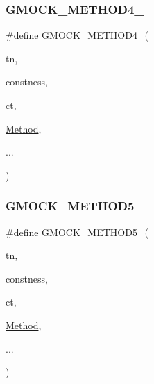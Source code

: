 \mbox{\label{_obj__test_2lib_2googletest-release-1_88_81_2googlemock_2include_2gmock_2gmock-generated-function-mockers_8h_ab6430f2cfad9de4aca5258ea559294bb}} 
\subsubsection{\texorpdfstring{GMOCK\_METHOD4\_}{GMOCK\_METHOD4\_}}
{\footnotesize\ttfamily \#define G\+M\+O\+C\+K\+\_\+\+M\+E\+T\+H\+O\+D4\+\_\+(\begin{DoxyParamCaption}\item[{}]{tn,  }\item[{}]{constness,  }\item[{}]{ct,  }\item[{}]{\mbox{\hyperlink{_obj__test_2lib_2googletest-release-1_88_81_2googlemock_2test_2gmock-spec-builders__test_8cc_a95606368148f3e5aab5db46c32466afd}{Method}},  }\item[{}]{... }\end{DoxyParamCaption})}

\mbox{\label{_obj__test_2lib_2googletest-release-1_88_81_2googlemock_2include_2gmock_2gmock-generated-function-mockers_8h_a9e3ecd392499ab19a4a6d3adcabf56f6}} 
\subsubsection{\texorpdfstring{GMOCK\_METHOD5\_}{GMOCK\_METHOD5\_}}
{\footnotesize\ttfamily \#define G\+M\+O\+C\+K\+\_\+\+M\+E\+T\+H\+O\+D5\+\_\+(\begin{DoxyParamCaption}\item[{}]{tn,  }\item[{}]{constness,  }\item[{}]{ct,  }\item[{}]{\mbox{\hyperlink{_obj__test_2lib_2googletest-release-1_88_81_2googlemock_2test_2gmock-spec-builders__test_8cc_a95606368148f3e5aab5db46c32466afd}{Method}},  }\item[{}]{... }\end{DoxyParamCaption})}

